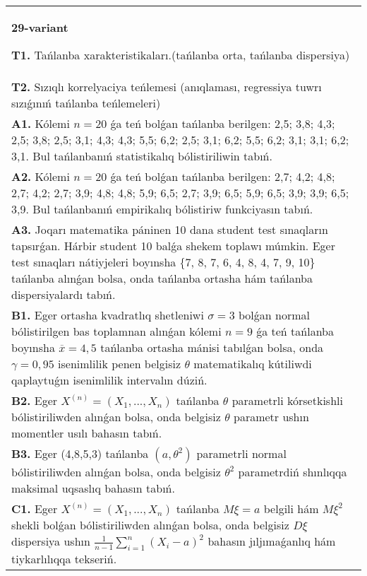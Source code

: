 \documentclass{article}
\begin{document}
\begin{tabular}{m{17cm}}
\end{tabular}
\vspace{1cm}


\begin{tabular}{m{17cm}}
\textbf{29-variant}
\newline

\textbf{T1.} 
Tańlanba xarakteristikaları.(tańlanba orta, tańlanba dispersiya)
 \\
\textbf{T2.} 
Sızıqlı korrelyaciya teńlemesi (anıqlaması, regressiya tuwrı sızıǵınıń tańlanba teńlemeleri)
 \\
\textbf{A1.} 
Kólemi \(n = 20\) ǵa teń bolǵan tańlanba berilgen: 2,5; 3,8; 4,3; 2,5; 3,8; 2,5; 3,1; 4,3; 4,3; 5,5; 6,2; 2,5; 3,1; 6,2; 5,5; 6,2; 3,1; 3,1; 6,2; 3,1. Bul tańlanbanıń statistikalıq bólistiriliwin tabıń.
 \\
\textbf{A2.} 
Kólemi \(n = 20\) ǵa teń bolǵan tańlanba berilgen: 2,7; 4,2; 4,8; 2,7; 4,2; 2,7; 3,9; 4,8; 4,8; 5,9; 6,5; 2,7; 3,9; 6,5; 5,9; 6,5; 3,9; 3,9; 6,5; 3,9. Bul tańlanbanıń empirikalıq bólistiriw funkciyasın tabıń.
 \\
\textbf{A3.} 
Joqarı matematika páninen 10 dana student test sınaqların tapsırǵan. Hárbir student 10 balǵa shekem toplawı múmkin. Eger test sınaqları nátiyjeleri boyınsha \{7, 8, 7, 6, 4, 8, 4, 7, 9, 10\} tańlanba alınǵan bolsa, onda tańlanba ortasha hám tańlanba dispersiyalardı tabıń.
 \\
\textbf{B1.} 
Eger ortasha kvadratlıq shetleniwi \(\sigma = 3\) bolǵan normal bólistirilgen bas toplamnan alınǵan kólemi \(n = 9\) ǵa teń tańlanba boyınsha \(\overline{x} = 4,5\) tańlanba ortasha mánisi tabılǵan bolsa, onda \(\gamma = 0,95\) isenimlilik penen belgisiz \(\theta\) matematikalıq kútiliwdi qaplaytuǵın isenimlilik intervalın dúziń.
 \\
\textbf{B2.} 
Eger \(X^{(n)} = \left( X_{1},...,X_{n} \right)\) tańlanba \(\theta\) parametrli kórsetkishli bólistiriliwden alınǵan bolsa, onda belgisiz \(\theta\) parametr ushın momentler usılı bahasın tabıń.
 \\
\textbf{B3.} 
Eger (4,8,5,3) tańlanba \(\left( a,\theta^{2} \right)\) parametrli normal bólistiriliwden alınǵan bolsa, onda belgisiz \(\theta^{2}\) parametrdiń shınlıqqa maksimal uqsaslıq bahasın tabıń.
 \\
\textbf{C1.} 
Eger \(X^{(n)} = \left( X_{1},...,X_{n} \right)\) tańlanba \(M\xi = a\) belgili hám \(M\xi^{2}\) shekli bolǵan bólistiriliwden alınǵan bolsa, onda belgisiz \(D\xi\) dispersiya ushın \(\frac{1}{n - 1}\sum_{i = 1}^{n}\left( X_{i} - a \right)^{2}\) bahasın jıljımaǵanlıq hám tiykarlılıqqa tekseriń.

\end{tabular}
\end{document}
